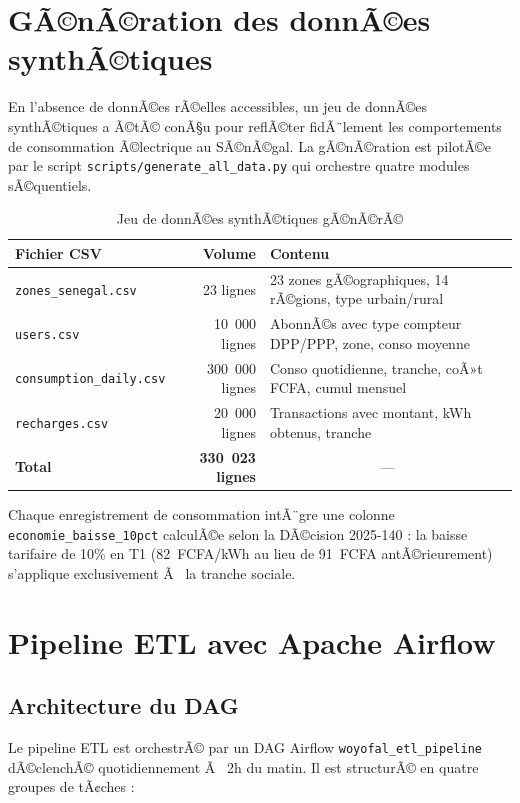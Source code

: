 \documentclass[12pt,a4paper]{report}
\begin{document}
\section{GÃ©nÃ©ration des donnÃ©es synthÃ©tiques}

En l'absence de donnÃ©es rÃ©elles accessibles, un jeu de donnÃ©es synthÃ©tiques a Ã©tÃ© conÃ§u pour reflÃ©ter fidÃ¨lement les comportements de consommation Ã©lectrique au SÃ©nÃ©gal. La gÃ©nÃ©ration est pilotÃ©e par le script \texttt{scripts/generate\_all\_data.py} qui orchestre quatre modules sÃ©quentiels.

\begin{table}[h!]
\centering
\caption{Jeu de donnÃ©es synthÃ©tiques gÃ©nÃ©rÃ©}
\label{tab:datasets}
\begin{tabularx}{\textwidth}{l r X}
\toprule
\rowcolor{marine!10}
Fichier CSV & Volume & Contenu \\
\midrule
\texttt{zones\_senegal.csv}     & 23 lignes     & 23 zones gÃ©ographiques, 14 rÃ©gions, type urbain/rural \\
\texttt{users.csv}              & 10~000 lignes & AbonnÃ©s avec type compteur DPP/PPP, zone, conso moyenne \\
\texttt{consumption\_daily.csv} & 300~000 lignes & Conso quotidienne, tranche, coÃ»t FCFA, cumul mensuel \\
\texttt{recharges.csv}          & 20~000 lignes & Transactions avec montant, kWh obtenus, tranche \\
\midrule
\textbf{Total} & \textbf{330~023 lignes} & \multicolumn{1}{c}{---} \\
\bottomrule
\end{tabularx}
\end{table}

Chaque enregistrement de consommation intÃ¨gre une colonne \texttt{economie\_baisse\_10pct} calculÃ©e selon la DÃ©cision 2025-140 : la baisse tarifaire de 10\% en T1 (82~FCFA/kWh au lieu de 91~FCFA antÃ©rieurement) s'applique exclusivement Ã  la tranche sociale.

\section{Pipeline ETL avec Apache Airflow}

\subsection{Architecture du DAG}

Le pipeline ETL est orchestrÃ© par un DAG Airflow \texttt{woyofal\_etl\_pipeline} dÃ©clenchÃ© quotidiennement Ã  2h du matin. Il est structurÃ© en quatre groupes de tÃ¢ches :
\end{document}
